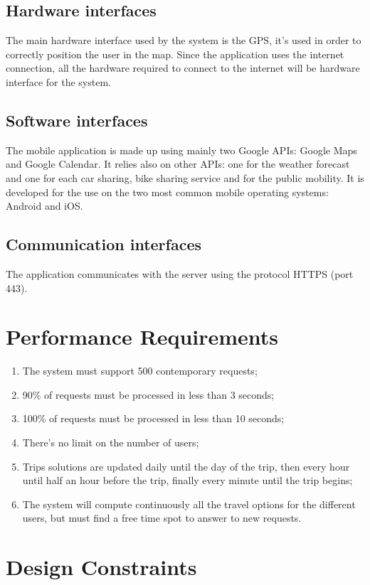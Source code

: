 \subsection{Hardware interfaces}
The main hardware interface used by the system is the GPS, it's used in order to correctly position the user in the map. Since the application uses the internet connection, all the hardware required to connect to the internet will be hardware interface for the system.
%
\subsection{Software interfaces}
The mobile application is made up using mainly two Google APIs: Google Maps and Google Calendar. It relies also on other APIs: one for the weather forecast and one for each car sharing, bike sharing service and for the public mobility.
It is developed for the use on the two most common mobile operating systems: Android and iOS.
%
\subsection{Communication interfaces}
The application communicates with the server using the protocol HTTPS (port 443).
%
%
\section{Performance Requirements}
\begin{enumerate}
\item The system must support 500 contemporary requests;
\item 90\% of requests must be processed in less than 3 seconds;
\item 100\% of requests must be processed in less than 10 seconds;
\item There’s no limit on the number of users;
\item Trips solutions are updated daily until the day of the trip, then every hour until half an hour before the trip, finally every minute until the trip begins;
\item The system will compute continuously all the travel options for the different users, but must find a free time spot to answer to new requests.
\end{enumerate}
%
%
\section{Design Constraints}
%
